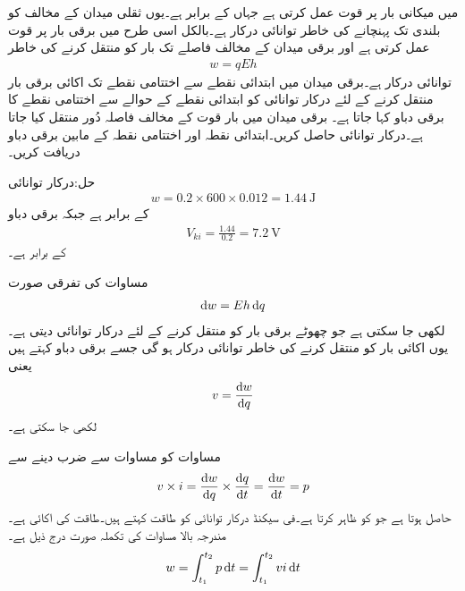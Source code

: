  میں میکانی بار  پر قوت  عمل کرتی ہے جہاں  کے برابر ہے۔یوں ثقلی میدان کے مخالف  کو  بلندی تک پہنچانے کی خاطر  توانائی درکار ہے۔بالکل اسی طرح   میں برقی بار  پر  قوت عمل کرتی ہے اور برقی میدان کے مخالف  فاصلے تک بار کو منتقل کرنے کی خاطر 
\begin{align}\label{مساوات_بنیادی_توانائی_دباو}
w=q E h
\end{align}
توانائی درکار ہے۔برقی میدان میں ابتدائی نقطے سے اختتامی نقطے تک اکائی برقی بار منتقل کرنے کے لئے درکار توانائی کو ابتدائی نقطے کے حوالے سے اختتامی نقطے کا برقی دباو کہا جاتا ہے۔
برقی میدان  میں  بار قوت کے مخالف  فاصلہ دُور منتقل کیا جاتا ہے۔درکار توانائی حاصل کریں۔ابتدائی نقطہ  اور اختتامی نقطہ  کے مابین برقی دباو دریافت کریں۔

حل:درکار توانائی
\begin{align*}
w=0.2 \times 600 \times 0.012=\SI{1.44}{\joule}
\end{align*}
کے برابر ہے جبکہ برقی دباو
\begin{align*}
V_{ki}=\frac{1.44}{0.2}=\SI{7.2}{\volt}
\end{align*}
کے برابر ہے۔

مساوات  کی تفرقی صورت 
\begin{align*}
\dif w= E h \dif q
\end{align*}
لکھی جا سکتی ہے جو چھوٹے برقی بار  کو منتقل کرنے کے لئے درکار توانائی  دیتی ہے۔یوں اکائی بار کو منتقل کرنے کی خاطر  توانائی درکار ہو گی جسے برقی دباو  کہتے ہیں یعنی
\begin{align}\label{مساوات_بنیادی_دباو_تعریف}
v=\frac{\dif w}{\dif q}
\end{align}
لکھی جا سکتی ہے۔

مساوات  کو مساوات  سے ضرب دینے سے
\begin{align}\label{مساوات_بنیادی_طاقت_مساوی_دباو_ضرب_رو}
v \times i = \frac{\dif w}{\dif q} \times \frac{\dif q}{\dif t}=\frac{\dif w}{\dif t}=p
\end{align}
حاصل ہوتا ہے جو   کو ظاہر کرتا ہے۔فی سیکنڈ درکار توانائی کو طاقت کہتے ہیں۔طاقت کی اکائی   ہے۔مندرجہ بالا مساوات کی تکملہ صورت درج ذیل ہے۔
\begin{align}
w=\int_{t_1}^{t_2} p \dif t=\int_{t_1}^{t_2} v i\dif t
\end{align}

